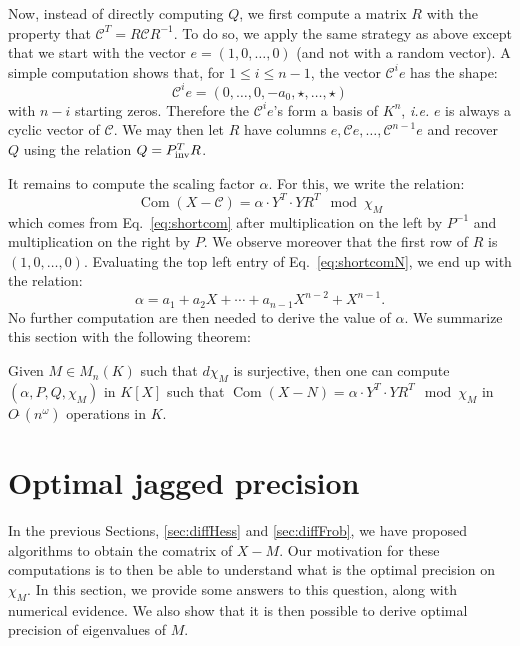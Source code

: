 \documentclass{sig-alternate-05-2015}
\DeclareMathOperator{\com}{Com}
\newcommand{\softO}{O\tilde{~}}
\newcommand{\inv}{\text{\rm inv}}
\begin{document}
Now, instead of directly computing $Q$, we first compute a matrix $R$ 
with the property that $\mathscr{C}^T = R \mathscr{C} R^{-1}$. To do so,
we apply the same strategy as above except that we start with the vector
$e = (1, 0, \ldots, 0)$ (and not with a random vector). A simple computation shows
that, for $1 \leq i \leq n{-}1$, the vector $\mathscr{C}^i e$ has the shape:
$$\mathscr{C}^i e = (0, \ldots, 0, -a_0, \star, \ldots, \star)$$
with $n{-}i$ starting zeros. Therefore the $\mathscr{C}^i e$'s form a basis of
$K^n$, \emph{i.e.} $e$ is always a cyclic vector of $\mathscr{C}$.
We may then let $R$ have columns $e, \mathscr{C}e, \dots, \mathscr{C}^{n-1}e$
and recover $Q$ using the relation $Q = P_\inv^T R$.

It remains to compute the scaling factor $\alpha$. For this, we write
the relation:
\begin{equation}
\label{eq:shortcomN}
\com(X{-}\mathscr{C}) = \alpha \cdot Y^T \cdot Y R^T \mod \chi_M
\end{equation}
which comes from Eq.~\eqref{eq:shortcom} after multiplication on the 
left by $P^{-1}$ and multiplication on the right by $P$. We observe
moreover that the first row of $R$ is $(1, 0, \ldots, 0)$. Evaluating
the top left entry of Eq.~\eqref{eq:shortcomN}, we end up with the 
relation:
$$\alpha = a_1 + a_2 X + \cdots + a_{n-1} X^{n-2} + X^{n-1}.$$
No further computation are then needed to derive the value of $\alpha$.
We summarize this section with the following theorem:

\begin{theo}
\label{thm:compute_shortcom}
Given $M \in M_n(K)$ such that $d \chi_M$ is surjective,
then one can compute $(\alpha, P, Q, \chi_M)$
in $K[X]$ such that
$\com(X{-}N) = \alpha \cdot Y^T \cdot Y R^T \mod \chi_M$
in $\softO(n^\omega)$ operations in $K.$
\end{theo}



\section{Optimal jagged precision}
\label{sec:optjagged}

In the previous Sections, \ref{sec:diffHess} and \ref{sec:diffFrob},
we have proposed algorithms to obtain the comatrix of 
$X-M.$ Our motivation for these computations is to then
be able to understand what is the optimal precision on $\chi_M.$
In this section, we provide some answers to this question,
along with numerical evidence.
We also show that it is then possible to derive 
optimal precision of eigenvalues of $M.$ 
\end{document}
